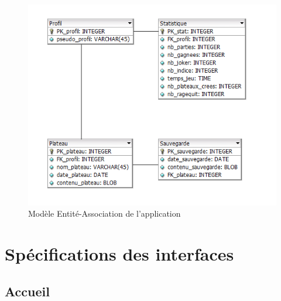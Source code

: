\documentclass[a4paper, 12pt, twoside]{article}
\begin{document}
\begin{figure}[H]
  \center
  \includegraphics[scale=1]{MEA.png}
  \caption{Modèle Entité-Association de l'application}
  \label{mea}
\end{figure}

\newpage
\section{Spécifications des interfaces}

\subsection{Accueil}
\end{document}
